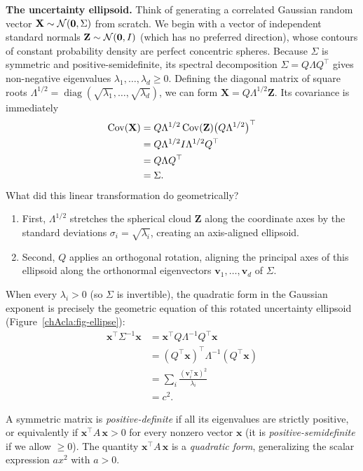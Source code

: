 \begin{intuitionbox}
\textbf{The uncertainty ellipsoid.} Think of generating a correlated Gaussian random vector $\mathbf{X} \sim \mathcal{N}(\mathbf{0}, \Sigma)$ from scratch. We begin with a vector of independent standard normals $\mathbf{Z} \sim \mathcal{N}(\mathbf{0}, I)$ (which has no preferred direction), whose contours of constant probability density are perfect concentric spheres.
Because $\Sigma$ is symmetric and positive-semidefinite, its spectral decomposition $\Sigma = Q\Lambda Q^\top$ gives non-negative eigenvalues $\lambda_1, \dots, \lambda_d \ge 0$. Defining the diagonal matrix of square roots $\Lambda^{1/2} = \operatorname{diag}(\sqrt{\lambda_1},\dots,\sqrt{\lambda_d})$, we can form $\mathbf{X} = Q\Lambda^{1/2}\mathbf{Z}$.
Its covariance is immediately
\begin{align*}
  \operatorname{Cov}(\mathbf{X}) &= Q\Lambda^{1/2} \operatorname{Cov}(\mathbf{Z}) \big(Q\Lambda^{1/2}\big)^\top \\
  &= Q\Lambda^{1/2} I \Lambda^{1/2} Q^\top \\
  &= Q\Lambda Q^\top \\
  &= \Sigma.
\end{align*}
What did this linear transformation do geometrically?
\begin{enumerate}
  \item First, $\Lambda^{1/2}$ stretches the spherical cloud $\mathbf{Z}$ along the coordinate axes by the standard deviations $\sigma_i = \sqrt{\lambda_i}$, creating an axis-aligned ellipsoid.
  \item Second, $Q$ applies an orthogonal rotation, aligning the principal axes of this ellipsoid along the orthonormal eigenvectors $\mathbf{v}_1, \dots, \mathbf{v}_d$ of $\Sigma$.
\end{enumerate}
When every $\lambda_i > 0$ (so $\Sigma$ is invertible), the quadratic form in the Gaussian exponent is precisely the geometric equation of this rotated uncertainty ellipsoid (Figure~\ref{chAcla:fig-ellipse}):
\begin{align*}
  \mathbf{x}^\top\Sigma^{-1}\mathbf{x} &= \mathbf{x}^\top Q\Lambda^{-1}Q^\top\mathbf{x} \\
  &= (Q^\top\mathbf{x})^\top\Lambda^{-1}(Q^\top\mathbf{x}) \\
  &= \sum_i \frac{(\mathbf{v}_i^\top\mathbf{x})^2}{\lambda_i} \\
  &= c^2.
\end{align*}
\end{intuitionbox}

A symmetric matrix is \emph{positive-definite} if all its eigenvalues are strictly positive, or
equivalently if $\mathbf{x}^\top A\,\mathbf{x} > 0$ for every nonzero vector $\mathbf{x}$ (it is
\emph{positive-semidefinite} if we allow $\ge 0$). The quantity $\mathbf{x}^\top A\,\mathbf{x}$ is a
\emph{quadratic form}, generalizing the scalar expression $a x^2$ with $a > 0$.

